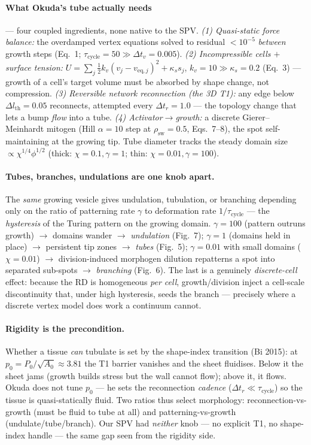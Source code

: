 \documentclass[11pt]{article}
\begin{document}
\paragraph{What Okuda's tube actually needs} --- four coupled ingredients, none native to the SPV.
\emph{(1) Quasi-static force balance:} the overdamped vertex equations solved to residual $<\!10^{-5}$
\emph{between} growth steps (Eq.~1; $\tau_{\text{cycle}}\!=\!50\!\gg\!\Delta t_v\!=\!0.005$).
\emph{(2) Incompressible cells $+$ surface tension:} $U=\sum_j\tfrac12 k_v(v_j-v_{\text{eq},j})^2+\kappa_s
s_j$, $k_v\!=\!10\!\gg\!\kappa_s\!=\!0.2$ (Eq.~3) --- growth of a cell's target volume must be absorbed
by shape change, not compression. \emph{(3) Reversible network reconnection (the 3D T1):} any edge below
$\Delta l_{\text{th}}\!=\!0.05$ reconnects, attempted every $\Delta t_r\!=\!1.0$ --- the topology change
that lets a bump \emph{flow} into a tube. \emph{(4) Activator$\to$growth:} a discrete Gierer--Meinhardt
mitogen (Hill $\alpha\!=\!10$ step at $\rho_{\text{sw}}\!=\!0.5$, Eqs.~7--8), the spot self-maintaining at
the growing tip. Tube diameter tracks the steady domain size $\propto\chi^{1/4}\phi^{1/2}$ (thick:
$\chi\!=\!0.1,\gamma\!=\!1$; thin: $\chi\!=\!0.01,\gamma\!=\!100$).

\paragraph{Tubes, branches, undulations are one knob apart.} The \emph{same} growing vesicle gives
undulation, tubulation, or branching depending only on the ratio of patterning rate $\gamma$ to
deformation rate $1/\tau_{\text{cycle}}$ --- the \emph{hysteresis} of the Turing pattern on the growing
domain. $\gamma\!=\!100$ (pattern outruns growth) $\to$ domains wander $\to$ \emph{undulation} (Fig.~7);
$\gamma\!=\!1$ (domains held in place) $\to$ persistent tip zones $\to$ \emph{tubes} (Fig.~5);
$\gamma\!=\!0.01$ with small domains ($\chi\!=\!0.01$) $\to$ division-induced morphogen dilution
repatterns a spot into separated sub-spots $\to$ \emph{branching} (Fig.~6). The last is a genuinely
\emph{discrete-cell} effect: because the RD is homogeneous \emph{per cell}, growth/division inject a
cell-scale discontinuity that, under high hysteresis, seeds the branch --- precisely where a discrete
vertex model does work a continuum cannot.

\paragraph{Rigidity is the precondition.} Whether a tissue \emph{can} tubulate is set by the shape-index
transition (Bi 2015): at $p_0\!=\!P_0/\sqrt{A_0}\!\approx\!3.81$ the T1 barrier vanishes and the sheet
fluidises. Below it the sheet jams (growth builds stress but the wall cannot flow); above it, it flows.
Okuda does not tune $p_0$ --- he sets the reconnection \emph{cadence} ($\Delta t_r\!\ll\!\tau_{\text{cycle}}$)
so the tissue is quasi-statically fluid. Two ratios thus select morphology: reconnection-vs-growth (must
be fluid to tube at all) and patterning-vs-growth (undulate/tube/branch). Our SPV had \emph{neither} knob
--- no explicit T1, no shape-index handle --- the same gap seen from the rigidity side.
\end{document}
